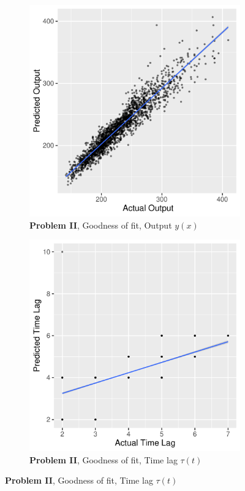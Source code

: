 \begin{figure}
  \centering

  \begin{subfigure}[b]{0.4\textwidth}
    \centering
    \includegraphics[width=\textwidth]{figures/exp2_scatter_v_test}
    \caption{ \textbf{Problem II}, Goodness of fit, Output $y(x)$}
    \label{fig:problem2_fitv}
  \end{subfigure}
  \hfill
  \begin{subfigure}[b]{0.4\textwidth}
    \centering
    \includegraphics[width=\textwidth]{figures/exp2_scatter_t_test}
    \caption{ \textbf{Problem II}, Goodness of fit, Time lag $\tau(t)$ }
    \label{fig:problem2_fitt}
  \end{subfigure}
  

\end{figure}
